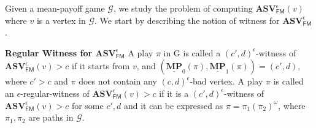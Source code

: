 Given a mean-payoff game $\mathcal{G}$, we study the problem of computing $\mathbf{ASV}^{\epsilon}_{\mathsf{FM}}(v)$ where $v$ is a vertex in $\mathcal{G}$. We start by describing the notion of witness for $\mathbf{ASV}^{\epsilon}_{\mathsf{FM}}$.

\noindent\textbf{Regular Witness for $\mathbf{ASV}^{\epsilon}_{\mathsf{FM}}$} A play $\pi$ in G is called a $(c',d)^{\epsilon}$-witness of $\mathbf{ASV}_{\mathsf{FM}}^{\epsilon}(v) > c$ if it starts from $v$, and $(\underline{\mathbf{MP}}_0(\pi), \underline{\mathbf{MP}}_1(\pi)) = (c', d)$, where $c' > c$ and $\pi$ does not contain any $(c,d)^{\epsilon}$-bad vertex. 
A play $\pi$ is called an $\epsilon$-regular-witness of $\mathbf{ASV}_{\mathsf{FM}}^{\epsilon}(v) > c$ if it is a $(c',d)^{\epsilon}$-witness of $\mathbf{ASV}_{\mathsf{FM}}^{\epsilon}(v) > c$ for some $c',d$ and it can be expressed as $\pi = \pi_1 (\pi_2)^{\omega}$, where $\pi_1, \pi_2$ are paths in $\mathcal{G}$.


